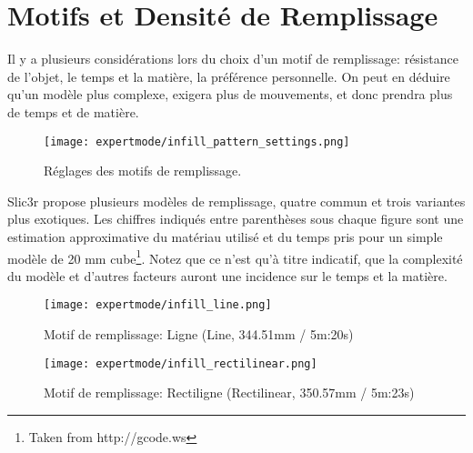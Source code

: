 
\section{Motifs et Densit\'e de Remplissage} %
\label{sec:infill_patterns_and_density}

Il y a plusieurs consid\'erations lors du choix d'un motif de remplissage: r\'esistance de l'objet, le temps et la mati\`ere, la pr\'ef\'erence personnelle. On peut en d\'eduire qu'un mod\`ele plus complexe, exigera plus de mouvements, et donc prendra plus de temps et de mati\`ere.

\begin{figure}[H]
\centering
\texttt{[image: expertmode/infill\_pattern\_settings.png]}
\caption{R\'eglages des motifs de remplissage.}
\label{fig:infill_pattern_settings}
\end{figure}


Slic3r propose plusieurs mod\`eles de remplissage, quatre commun et trois variantes plus exotiques. Les chiffres indiqu\'es entre parenth\`eses sous chaque figure sont une estimation approximative du mat\'eriau utilis\'e et du temps pris pour un simple mod\`ele de 20 mm cube\footnote{Taken from http://gcode.ws}.  Notez que ce n'est qu'\`a titre indicatif, que la complexit\'e du mod\`ele et d'autres facteurs auront une incidence sur le temps et la mati\`ere.

\begin{figure}[H]
\centering
\texttt{[image: expertmode/infill\_line.png]}
\caption{Motif de remplissage: Ligne (Line, 344.51mm / 5m:20s)}
\label{fig:infill_line}
\end{figure}

\begin{figure}[H]
\centering
\texttt{[image: expertmode/infill\_rectilinear.png]}
\caption{Motif de remplissage: Rectiligne (Rectilinear, 350.57mm / 5m:23s)}
\label{fig:infill_rectilinear}
\end{figure}

